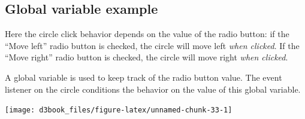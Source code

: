 \documentclass[openany]{book}
\begin{document}
\hypertarget{global-variable-example}{%
\subsection{Global variable example}\label{global-variable-example}}

Here the circle click behavior depends on the value of the radio button: if the ``Move left'' radio button is checked, the circle will move left \emph{when clicked}. If the ``Move right'' radio button is checked, the circle will move right \emph{when clicked}.

A global variable is used to keep track of the radio button value. The event listener on the circle conditions the behavior on the value of this global variable.

\begin{center}\texttt{[image: d3book\_files/figure-latex/unnamed-chunk-33-1]} \end{center}
\end{document}

